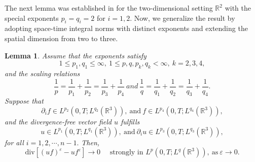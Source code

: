 \documentclass[11pt]{article}
\theoremstyle{plain}\newtheorem{definition}{Definition}[section]
\theoremstyle{definition}\newtheorem{theorem}{Theorem}[section]
\theoremstyle{plain}\newtheorem{lemma}[theorem]{Lemma}
\theoremstyle{plain}\newtheorem{coro}[theorem]{Corollary}
\theoremstyle{plain}\newtheorem{prop}[theorem]{Proposition}
\theoremstyle{remark}\newtheorem{remark}{Remark}[section]
\newcommand{\s}{\mathrm{div}}
\numberwithin{equation}{section}
\begin{document}
The next lemma was established in \cite{[DW]} for the two-dimensional setting $\mathbb{R}^2$ with the special exponents $p_i=q_i=2$ for $i=1,2$. Now, we generalize the result by adopting space-time integral norms with distinct exponents and extending the spatial dimension from two to three.


\begin{lemma}
	\label{pLions}  Assume that the exponents satisfy $$1\leq p_1,q_1\leq \infty,~1\leq p, q, p_k, q_k< \infty,~k=2,3,4,$$ and the scaling relations $$\frac{1}{p}=\frac{1}{p_1}+\frac{1}{p_2}=\frac{1}{p_3}+\frac{1}{p_4}~ and ~ \frac{1}{q}=\frac{1}{q_1}+\frac{1}{q_2}=\frac{1}{q_3}+\frac{1}{q_4}.$$ Suppose that $$\partial_{i}f\in L^{p_2}(0,T;L^{q_2}(\mathbb{R}^3)), ~\text{and}~f\in L^{p_4}(0,T;L^{q_4}(\mathbb{R}^3)),$$
	and the divergence-free vector field $u$ fulfills
	 $$  u\in L^{p_1}(0,T;L^{q_1}(\mathbb{R}^3)),~\text{and}~\partial_{i} u\in L^{p_3}(0,T;L^{q_3}(\mathbb{R}^3)),$$
	 for all $i=1, 2,\cdots,n-1.$
Then,  $$  \s[(uf)^\varepsilon  -   u  f^\varepsilon   ]\to 0\quad\text{ strongly~in } {L^{p}(0,T;L^{q}(\mathbb{R}^3))},~\text{as}~\varepsilon\to 0.$$
\end{lemma}
\end{document}
